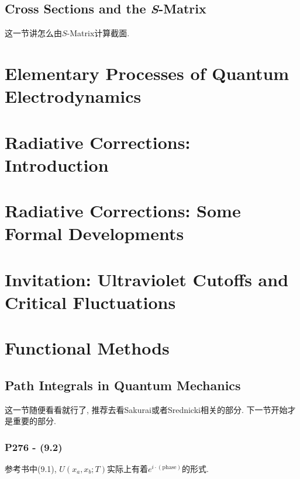 \documentclass[cn,hazy,blue,11pt,device=normal,chinesefont=founder]{elegantnote}
\begin{document}
\subsection{Cross Sections and the \textit{S}-Matrix}

这一节讲怎么由$S$-Matrix计算截面. 

\subsubsection{}



\clearpage

\section{Elementary Processes of Quantum Electrodynamics}

\section{Radiative Corrections: Introduction}

\section{Radiative Corrections: Some Formal Developments}

\section{Invitation: Ultraviolet Cutoffs and Critical Fluctuations}

\clearpage

\section{Functional Methods}

\subsection{Path Integrals in Quantum Mechanics}

这一节随便看看就行了, 推荐去看Sakurai或者Srednicki相关的部分. 下一节开始才是重要的部分. 

\subsubsection{P276 - (9.2)}

参考书中(9.1), $U(x_a, x_b; T)$实际上有着$e^{i \cdot (\text{phase})}$的形式. 
\end{document}
